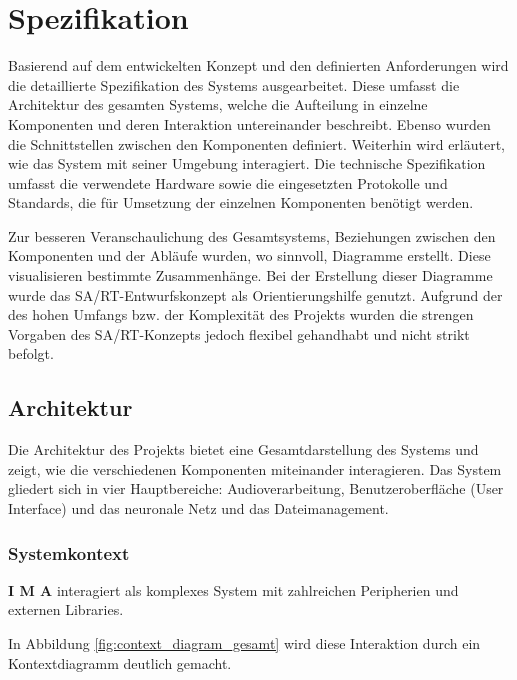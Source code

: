 \newpage
\section{Spezifikation}
Basierend auf dem entwickelten Konzept und den definierten Anforderungen wird die detaillierte Spezifikation des Systems ausgearbeitet. Diese umfasst die Architektur des gesamten Systems, welche die Aufteilung in einzelne Komponenten und deren Interaktion untereinander beschreibt. Ebenso wurden die Schnittstellen zwischen den Komponenten definiert. Weiterhin wird erläutert, wie das System mit seiner Umgebung interagiert. Die technische Spezifikation umfasst die verwendete Hardware sowie die eingesetzten Protokolle und Standards, die für Umsetzung der einzelnen Komponenten benötigt werden. 

Zur besseren Veranschaulichung des Gesamtsystems, Beziehungen zwischen den Komponenten und der Abläufe wurden, wo sinnvoll, Diagramme erstellt. Diese visualisieren bestimmte Zusammenhänge. Bei der Erstellung dieser Diagramme wurde das SA/RT-Entwurfskonzept als Orientierungshilfe genutzt. Aufgrund der des hohen Umfangs bzw. der Komplexität des Projekts wurden die strengen Vorgaben des SA/RT-Konzepts jedoch flexibel gehandhabt und nicht strikt befolgt.

\subsection{Architektur}
Die Architektur des Projekts bietet eine Gesamtdarstellung des Systems und zeigt, wie die verschiedenen Komponenten miteinander interagieren. Das System gliedert sich in vier Hauptbereiche: Audioverarbeitung, Benutzeroberfläche (User Interface) und das neuronale Netz und das Dateimanagement.

\subsubsection{Systemkontext}

\textbf{I M A} interagiert als komplexes System mit zahlreichen Peripherien und externen Libraries. 

In Abbildung \ref{fig:context_diagram_gesamt} wird diese Interaktion durch ein Kontextdiagramm deutlich gemacht.

